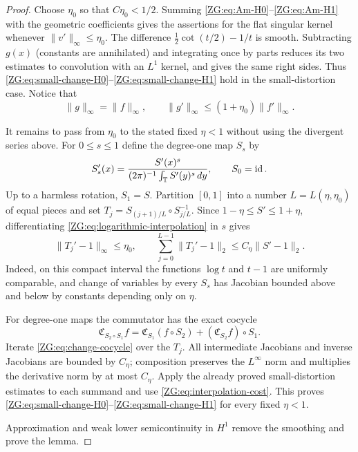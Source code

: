 \begin{proof}
Choose $\eta_0$ so that $C\eta_0<1/2$.  Summing
\eqref{ZG:eq:Am-H0}--\eqref{ZG:eq:Am-H1} with the geometric coefficients gives
the assertions for the flat singular kernel whenever
$\|v'\|_\infty\le\eta_0$.  The
difference $\frac12\cot(t/2)-1/t$ is smooth.  Subtracting $g(x)$ (constants
are annihilated) and integrating once by parts reduces its two estimates
to convolution with an $L^1$ kernel, and gives the same right sides.
Thus \eqref{ZG:eq:small-change-H0}--\eqref{ZG:eq:small-change-H1} hold in the
small-distortion case.  Notice that
\[
 \|g\|_\infty=\|f\|_\infty,
 \qquad \|g'\|_\infty\le(1+\eta_0)\|f'\|_\infty.
\]

It remains to pass from $\eta_0$ to the stated fixed $\eta<1$ without
using the divergent series above.  For $0\le s\le1$ define the degree-one
map $S_s$ by
\begin{equation}\label{ZG:eq:logarithmic-interpolation}
 S_s'(x)=\frac{S'(x)^s}{(2\pi)^{-1}\int_\mathbb T S'(y)^s\,dy},
 \qquad S_0=\operatorname {id}.
\end{equation}
Up to a harmless rotation, $S_1=S$.  Partition $[0,1]$ into a number
$L=L(\eta,\eta_0)$ of equal pieces and set
$T_j=S_{(j+1)/L}\circ S_{j/L}^{-1}$.  Since
$1-\eta\le S'\le1+\eta$, differentiating
\eqref{ZG:eq:logarithmic-interpolation} in $s$ gives
\begin{equation}\label{ZG:eq:interpolation-cost}
 \|T_j'-1\|_\infty\le\eta_0,
 \qquad
 \sum_{j=0}^{L-1}\|T_j'-1\|_2
 \le C_\eta\|S'-1\|_2.
\end{equation}
Indeed, on this compact interval the functions $\log t$ and $t-1$ are
uniformly comparable, and change of variables by every $S_s$ has
Jacobian bounded above and below by constants depending only on $\eta$.

For degree-one maps the commutator has the exact cocycle
\begin{equation}\label{ZG:eq:change-cocycle}
 \mathfrak C_{S_2\circ S_1}f
 =\mathfrak C_{S_1}(f\circ S_2)
   +(\mathfrak C_{S_2}f)\circ S_1.
\end{equation}
Iterate \eqref{ZG:eq:change-cocycle} over the $T_j$.  All intermediate
Jacobians and inverse Jacobians are bounded by $C_\eta$; composition
preserves the $L^\infty$ norm and multiplies the derivative norm by at
most $C_\eta$.  Apply the already proved small-distortion estimates to
each summand and use \eqref{ZG:eq:interpolation-cost}.  This proves
\eqref{ZG:eq:small-change-H0}--\eqref{ZG:eq:small-change-H1} for every fixed
$\eta<1$.

Approximation and weak lower semicontinuity in $H^1$ remove the smoothing
and prove the lemma.
\end{proof}

